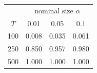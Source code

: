 % 
\begin{tabular}{cccc}
  \hline
  & \multicolumn{3}{c}{nominal size $\alpha$} \\
 $T$ & 0.01 & 0.05 & 0.1 \\
 \hline
100 & 0.008 & 0.035 & 0.061 \\ 
  250 & 0.850 & 0.957 & 0.980 \\ 
  500 & 1.000 & 1.000 & 1.000 \\ 
   \hline
\end{tabular}
